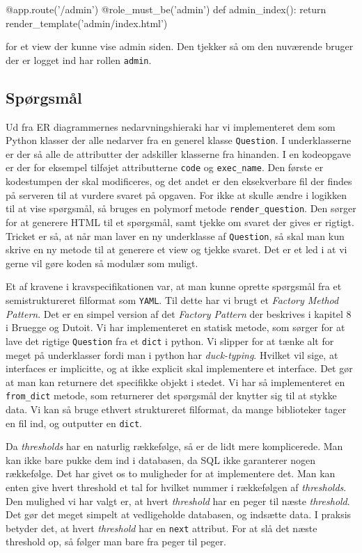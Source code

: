 \documentclass[11pt, a4paper]{article}
\begin{document}
\begin{python}
@app.route('/admin')
@role_must_be('admin')
def admin_index():
    return render_template('admin/index.html')
\end{python}
for et view der kunne vise admin siden. Den tjekker så om den nuværende bruger der er logget ind har rollen \verb!admin!.

\subsection{Spørgsmål}
\label{sub:sporgsmal}

Ud fra ER diagrammernes nedarvningshieraki har vi implementeret dem som Python klasser der alle nedarver fra en generel klasse \verb!Question!. I underklasserne er der så alle de attributter der adskiller klasserne fra hinanden. I en kodeopgave er der for eksempel tilføjet attributterne \verb!code! og \verb!exec_name!. Den første er kodestumpen der skal modificeres, og det andet er den eksekverbare fil der findes på serveren til at vurdere svaret på opgaven. For ikke at skulle ændre i logikken til at vise spørgsmål, så bruges en polymorf metode \verb!render_question!. Den sørger for at generere HTML til et spørgsmål, samt tjekke om svaret der gives er rigtigt. Tricket er så, at når man laver en ny underklasse af \verb!Question!, så skal man kun skrive en ny metode til at generere et view og tjekke svaret. Det er et led i at vi gerne vil gøre koden så modulær som muligt.

Et af kravene i kravspecifikationen var, at man kunne oprette spørgsmål fra et semistruktureret filformat som \verb!YAML!. Til dette har vi brugt et \emph{Factory Method Pattern}. Det er en simpel version af det \emph{Factory Pattern} der beskrives i kapitel 8 i Bruegge og Dutoit\cite{OOSE}. Vi har implementeret en statisk metode, som sørger for at lave det rigtige \verb!Question! fra et \verb!dict! i python. Vi slipper for at tænke alt for meget på underklasser fordi man i python har \emph{duck-typing}. Hvilket vil sige, at interfaces er implicitte, og at ikke explicit skal implementere et interface. Det gør at man kan returnere det specifikke objekt i stedet. Vi har så implementeret en \verb!from_dict! metode, som returnerer det spørgsmål der knytter sig til at stykke data. Vi kan så bruge ethvert struktureret filformat, da mange biblioteker tager en fil ind, og outputter en \verb!dict!.

Da \emph{thresholds} har en naturlig rækkefølge, så er de lidt mere komplicerede. Man kan ikke bare pukke dem ind i databasen, da SQL ikke garanterer nogen rækkefølge. Det har givet os to muligheder for at implementere det. Man kan enten give hvert threshold et tal for hvilket nummer i rækkefølgen af \emph{thresholds}. Den mulighed vi har valgt er, at hvert \emph{threshold} har en peger til næste \emph{threshold}. Det gør det meget simpelt at vedligeholde databasen, og indsætte data. I praksis betyder det, at hvert \emph{threshold} har en \verb!next! attribut. For at slå det næste threshold op, så følger man bare fra peger til peger.
\end{document}
